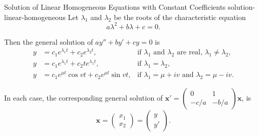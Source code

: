 \documentclass[12pt, a4paper]{report}
\begin{document}
	\begin{mytheo}{Solution of Linear Homogeneous Equations with Constant Coefficients {}}{solution-linear-homogeneous}
		Let $\lambda_1$ and $\lambda_2$ be the roots of the characteristic equation
		\begin{equation*}
			a\lambda^2 + b\lambda + c = 0.
		\end{equation*}
		
		Then the general solution of $ay'' + by' + cy = 0$ is
		\begin{align}
			y &= c_1 e^{\lambda_1 t} + c_2 e^{\lambda_2 t}, & \text{if } \lambda_1 \text{ and } \lambda_2 \text{ are real, } \lambda_1 \neq \lambda_2, \\
			y &= c_1 e^{\lambda_1 t} + c_2 t e^{\lambda_1 t}, & \text{if } \lambda_1 = \lambda_2, \\
			y &= c_1 e^{\mu t} \cos vt + c_2 e^{\mu t} \sin vt, & \text{if } \lambda_1 = \mu + iv \text{ and } \lambda_2 = \mu - iv. \label{eq:problem3:general_complex_solution}
		\end{align}
		
		In each case, the corresponding general solution of $\mathbf{x}' = \begin{pmatrix} 0 & 1 \\ -c/a & -b/a \end{pmatrix} \mathbf{x}$, is
		\begin{equation*}
			\mathbf{x} = \begin{pmatrix} x_1 \\ x_2 \end{pmatrix} = \begin{pmatrix} y \\ y' \end{pmatrix}.
		\end{equation*}
		

\end{mytheo}
\end{document}
